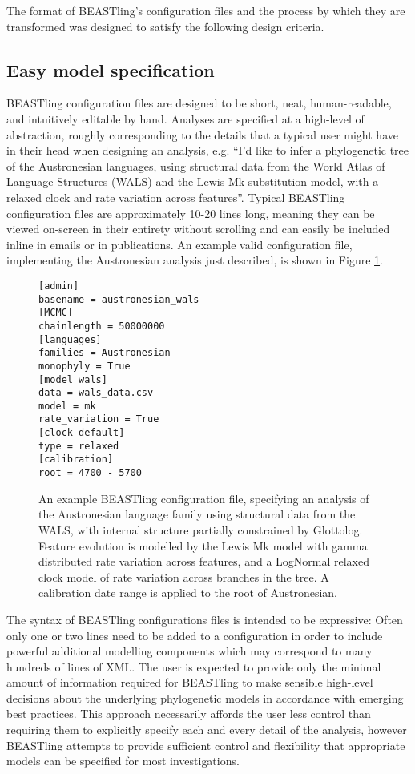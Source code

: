 \documentclass[10pt,a4paper]{article}
\begin{document}
The format of BEASTling's configuration files and the process by which they are transformed was designed to satisfy the following design criteria.

\subsection{Easy model specification}

BEASTling configuration files are designed to be short, neat, human-readable, and intuitively editable by hand.  Analyses are specified at a high-level of abstraction, roughly corresponding to the details that a typical user might have in their head when designing an analysis, e.g. ``I'd like to infer a phylogenetic tree of the Austronesian languages, using structural data from the World Atlas of Language Structures\cite{Dryer2013} (WALS) and the Lewis Mk substitution model\cite{Lewis2001}, with a relaxed clock and rate variation across features''.  Typical BEASTling configuration files are approximately 10-20 lines long, meaning they can be viewed on-screen in their entirety without scrolling and can easily be included inline in emails or in publications.  An example valid configuration file, implementing the Austronesian analysis just described, is shown in Figure \ref{fig:config}.

\begin{figure}[t]
	\begin{verbatim}[admin]
basename = austronesian_wals
[MCMC]
chainlength = 50000000
[languages]
families = Austronesian
monophyly = True
[model wals]
data = wals_data.csv
model = mk
rate_variation = True
[clock default]
type = relaxed
[calibration]
root = 4700 - 5700\end{verbatim}
\caption{An example BEASTling configuration file, specifying an analysis of the Austronesian language family using structural data from the WALS, with internal structure partially constrained by Glottolog. Feature evolution is modelled by the Lewis Mk model with gamma distributed rate variation across features, and a LogNormal relaxed clock model of rate variation across branches in the tree.  A calibration date range is applied to the root of Austronesian.}
\label{fig:config}
\end{figure}

The syntax of BEASTling configurations files is intended to be expressive:  Often only one or two lines need to be added to a configuration in order to include powerful additional modelling components which may correspond to many hundreds of lines of XML.  The user is expected to provide only the minimal amount of information required for BEASTling to make sensible high-level decisions about the underlying phylogenetic models in accordance with emerging best practices.  This approach necessarily affords the user less control than requiring them to explicitly specify each and every detail of the analysis, however BEASTling attempts to provide sufficient control and flexibility that appropriate models can be specified for most investigations.
\end{document}

